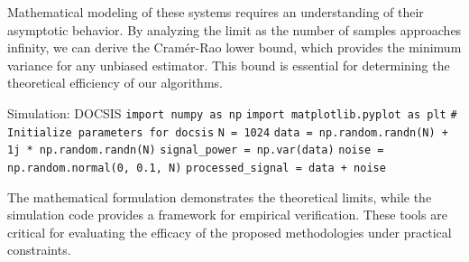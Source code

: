 Mathematical modeling of these systems requires an understanding of their asymptotic behavior. By analyzing the limit as the number of samples approaches infinity, we can derive the Cramér-Rao lower bound, which provides the minimum variance for any unbiased estimator. This bound is essential for determining the theoretical efficiency of our algorithms.

\begin{pythonbox}{Simulation: DOCSIS}
\texttt{import numpy as np}
\texttt{import matplotlib.pyplot as plt}
\texttt{}
\texttt{\# Initialize parameters for docsis}
\texttt{N = 1024}
\texttt{data = np.random.randn(N) + 1j * np.random.randn(N)}
\texttt{signal\_power = np.var(data)}
\texttt{noise = np.random.normal(0, 0.1, N)}
\texttt{processed\_signal = data + noise}
\end{pythonbox}

\vspace{0.5cm}
The mathematical formulation demonstrates the theoretical limits, while the simulation code provides a framework for empirical verification. These tools are critical for evaluating the efficacy of the proposed methodologies under practical constraints.


